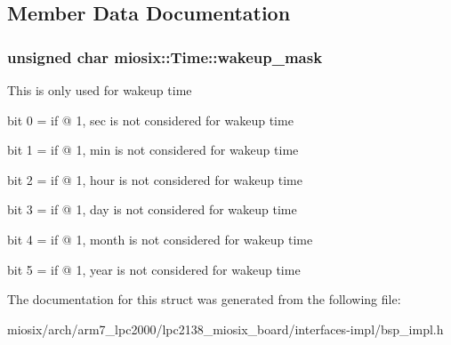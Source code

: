 \subsection{Member Data Documentation}
\hypertarget{structmiosix_1_1_time_a3673fc828b66c204ab68cf1a1fb1020a}{
\subsubsection[{wakeup\-\_\-mask}]{\setlength{\rightskip}{0pt plus 5cm}unsigned char miosix\-::\-Time\-::wakeup\-\_\-mask}}\label{structmiosix_1_1_time_a3673fc828b66c204ab68cf1a1fb1020a}
This is only used for wakeup time
\begin{DoxyItemize}
\item bit 0 = if @ 1, sec is not considered for wakeup time
\item bit 1 = if @ 1, min is not considered for wakeup time
\item bit 2 = if @ 1, hour is not considered for wakeup time
\item bit 3 = if @ 1, day is not considered for wakeup time
\item bit 4 = if @ 1, month is not considered for wakeup time
\item bit 5 = if @ 1, year is not considered for wakeup time 
\end{DoxyItemize}

The documentation for this struct was generated from the following file\-:\begin{DoxyCompactItemize}
\item 
miosix/arch/arm7\-\_\-lpc2000/lpc2138\-\_\-miosix\-\_\-board/interfaces-\/impl/bsp\-\_\-impl.\-h\end{DoxyCompactItemize}
